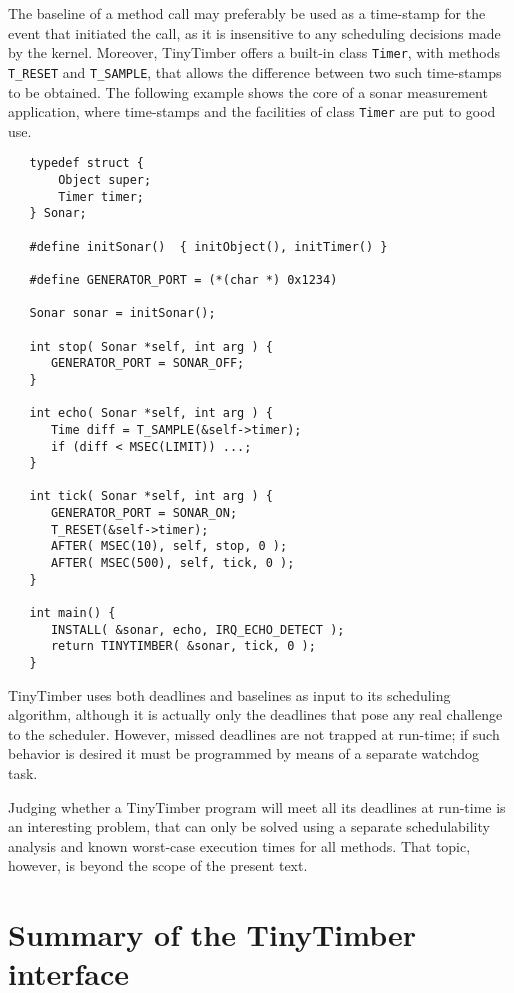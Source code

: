 \documentclass[12pt]{article}
\begin{document}
The baseline of a method call may preferably be used as a time-stamp for the event that initiated the call, as it is insensitive to any scheduling decisions made by the kernel. Moreover, TinyTimber offers a built-in class {\tt Timer}, with methods {\tt T\_RESET} and {\tt T\_SAMPLE}, that allows the difference between two such time-stamps to be obtained. The following example shows the core of a sonar measurement application, where time-stamps and the facilities of class {\tt Timer} are put to good use.
\begin{verbatim}
   typedef struct {
       Object super;
       Timer timer;
   } Sonar;
   
   #define initSonar()  { initObject(), initTimer() }

   #define GENERATOR_PORT = (*(char *) 0x1234)
   
   Sonar sonar = initSonar();
      
   int stop( Sonar *self, int arg ) {
      GENERATOR_PORT = SONAR_OFF;
   }
   
   int echo( Sonar *self, int arg ) {
      Time diff = T_SAMPLE(&self->timer);
      if (diff < MSEC(LIMIT)) ...;
   }
   
   int tick( Sonar *self, int arg ) {
      GENERATOR_PORT = SONAR_ON;
      T_RESET(&self->timer);
      AFTER( MSEC(10), self, stop, 0 );
      AFTER( MSEC(500), self, tick, 0 );
   }
   
   int main() {
      INSTALL( &sonar, echo, IRQ_ECHO_DETECT );
      return TINYTIMBER( &sonar, tick, 0 );
   }
\end{verbatim}

TinyTimber uses both deadlines and baselines as input to its scheduling algorithm, although it is actually only the deadlines that pose any real challenge to the scheduler.  However, missed deadlines are not trapped at run-time; if such behavior is desired it must be programmed by means of a separate watchdog task.

Judging whether a TinyTimber program will meet all its deadlines at run-time is an interesting problem, that can only be solved using a separate schedulability analysis and known worst-case execution times for all methods.  That topic, however, is beyond the scope of the present text.


\section{Summary of the TinyTimber interface}
\end{document}

